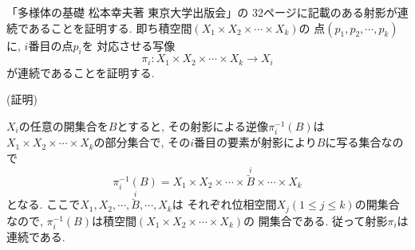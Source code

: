 \documentclass{jlreq}
\begin{document}
「多様体の基礎 松本幸夫著 東京大学出版会」の
32ページに記載のある射影が連続であることを証明する.
即ち積空間$( X_{1} \times X_{2} \times \cdots \times X_{k} )$の
点$(p_{1} , p_{2} , \cdots , p_{k} )$に, $i$番目の点$p_{i}$を
対応させる写像
\[ \pi_{i} : X_{1} \times X_{2} \times \cdots \times X_{k} \to X_{i} \]
が連続であることを証明する.

(証明)

$X_{i}$の任意の開集合を$B$とすると, その射影による逆像$\pi_{i}^{-1}(B)$は
$X_{1} \times X_{2} \times \cdots \times X_{k}$の部分集合で,
その$i$番目の要素が射影により$B$に写る集合なので
\[ \pi_{i}^{-1}(B) = X_{1} \times X_{2} \times \cdots \times
    \stackrel{i}{\breve{B}} \times \cdots \times X_{k} \]
となる.
ここで$X_{1}, X_{2}, \cdots , \stackrel{i}{\breve{B}} , \cdots , X_{k}$は
それぞれ位相空間$X_{j} (1 \le j \le k)$の開集合なので,
$\pi_{i}^{-1}(B)$は積空間$( X_{1} \times X_{2} \times \cdots \times X_{k} )$の
開集合である.
従って射影$\pi_{i}$は連続である.
\end{document}
